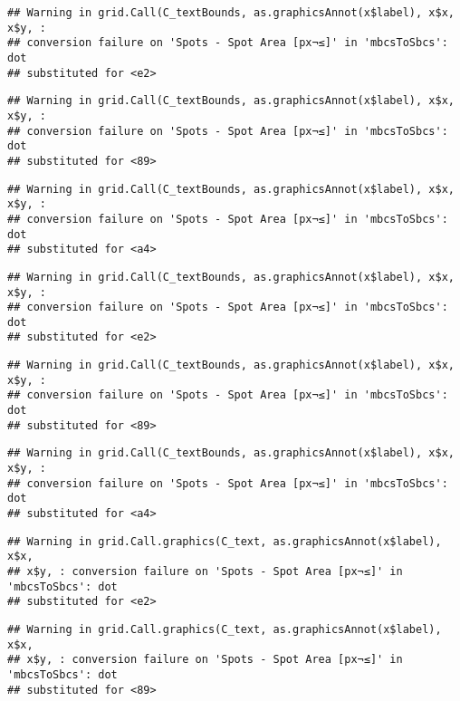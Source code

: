 \documentclass[
]{article}
\begin{document}
\begin{verbatim}
## Warning in grid.Call(C_textBounds, as.graphicsAnnot(x$label), x$x, x$y, :
## conversion failure on 'Spots - Spot Area [px¬≤]' in 'mbcsToSbcs': dot
## substituted for <e2>
\end{verbatim}

\begin{verbatim}
## Warning in grid.Call(C_textBounds, as.graphicsAnnot(x$label), x$x, x$y, :
## conversion failure on 'Spots - Spot Area [px¬≤]' in 'mbcsToSbcs': dot
## substituted for <89>
\end{verbatim}

\begin{verbatim}
## Warning in grid.Call(C_textBounds, as.graphicsAnnot(x$label), x$x, x$y, :
## conversion failure on 'Spots - Spot Area [px¬≤]' in 'mbcsToSbcs': dot
## substituted for <a4>
\end{verbatim}

\begin{verbatim}
## Warning in grid.Call(C_textBounds, as.graphicsAnnot(x$label), x$x, x$y, :
## conversion failure on 'Spots - Spot Area [px¬≤]' in 'mbcsToSbcs': dot
## substituted for <e2>
\end{verbatim}

\begin{verbatim}
## Warning in grid.Call(C_textBounds, as.graphicsAnnot(x$label), x$x, x$y, :
## conversion failure on 'Spots - Spot Area [px¬≤]' in 'mbcsToSbcs': dot
## substituted for <89>
\end{verbatim}

\begin{verbatim}
## Warning in grid.Call(C_textBounds, as.graphicsAnnot(x$label), x$x, x$y, :
## conversion failure on 'Spots - Spot Area [px¬≤]' in 'mbcsToSbcs': dot
## substituted for <a4>
\end{verbatim}

\begin{verbatim}
## Warning in grid.Call.graphics(C_text, as.graphicsAnnot(x$label), x$x,
## x$y, : conversion failure on 'Spots - Spot Area [px¬≤]' in 'mbcsToSbcs': dot
## substituted for <e2>
\end{verbatim}

\begin{verbatim}
## Warning in grid.Call.graphics(C_text, as.graphicsAnnot(x$label), x$x,
## x$y, : conversion failure on 'Spots - Spot Area [px¬≤]' in 'mbcsToSbcs': dot
## substituted for <89>
\end{verbatim}
\end{document}
